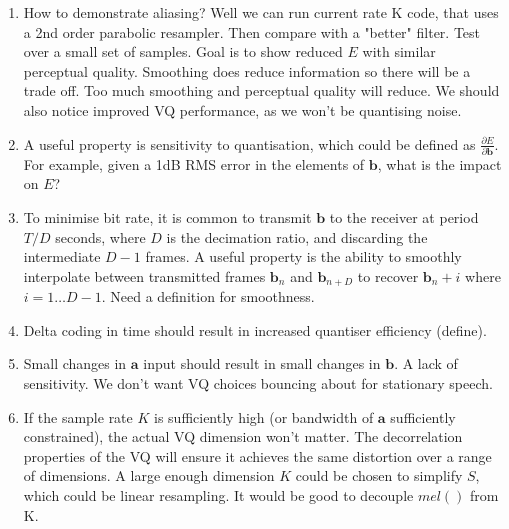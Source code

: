 \documentclass{article}
\begin{document}
\begin{enumerate}

\item How to demonstrate aliasing?  Well we can run current rate K code, that uses a 2nd order parabolic resampler.  Then compare with a "better" filter.  Test over a small set of samples.  Goal is to show reduced $E$ with similar perceptual quality.  Smoothing does reduce information so there will be a trade off.  Too much smoothing and perceptual quality will reduce.  We should also notice improved VQ performance, as we won't be quantising noise.

\item A useful property is sensitivity to quantisation, which could be defined as $\frac{\partial E}{\partial \mathbf{b}}$. For example, given a 1dB RMS error in the elements of $\mathbf{b}$, what is the impact on $E$?

\item To minimise bit rate, it is common to transmit $\mathbf{b}$ to the receiver at period $T/D$ seconds, where $D$ is the decimation ratio, and discarding the intermediate $D-1$ frames. A useful property is the ability to smoothly interpolate between transmitted frames $\mathbf{b}_n$ and $\mathbf{b}_{n+D}$ to recover $\mathbf{b}_n+i$ where $i=1 \ldots D-1$.  Need a definition for smoothness.

\item Delta coding in time should result in increased quantiser efficiency (define).

\item Small changes in $\mathbf{a}$ input should result in small changes in  $\mathbf{b}$.  A lack of sensitivity.  We don't want VQ choices bouncing about for stationary speech.

\item If the sample rate $K$ is sufficiently high (or bandwidth of $\mathbf{a}$ sufficiently constrained), the actual VQ dimension won't matter.  The decorrelation properties of the VQ will ensure it achieves the same distortion over a range of dimensions.  A large enough dimension $K$ could be chosen to simplify $S$, which could be linear resampling. It would be good to decouple $mel()$ from K.
\end{enumerate}
\end{document}
